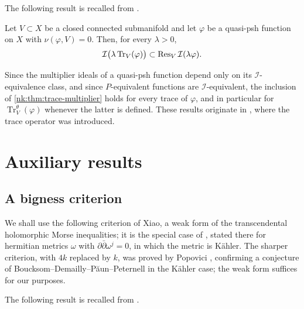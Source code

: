 The following result is recalled from \cite[Proposition~8.2.3]{SGPT}.

\begin{theorem}\label{nk:thm:trace-multiplier}
Let $V\subset X$ be a closed connected submanifold and let $\varphi$ be a
quasi-psh function on $X$ with $\nu(\varphi,V)=0$. Then, for every
$\lambda>0$,
\[
  \mathcal I\bigl(\lambda\operatorname{Tr}_V(\varphi)\bigr)\subset\operatorname{Res}_{V}\mathcal I(\lambda\varphi).
\]
\end{theorem}

Since the multiplier ideals of a quasi-psh function depend only on its
$\mathcal I$-equivalence class, and since $P$-equivalent functions are
$\mathcal I$-equivalent, the inclusion of \cref{nk:thm:trace-multiplier} holds for
every trace of $\varphi$, and in particular for
$\operatorname{Tr}^\theta_V(\varphi)$ whenever the latter is defined. These results
originate in \cite{DX24}, where the trace operator was introduced.

\section{Auxiliary results}\label{nk:sec:aux}

\subsection{A bigness criterion}

We shall use the following criterion of Xiao, a weak form of the
transcendental holomorphic Morse inequalities; it is the special case of
\cite[Theorem~1.4]{Xiao15}, stated there for hermitian metrics $\omega$
with $\partial\bar\partial\omega^j=0$, in which the metric is K\"ahler.
The sharper criterion, with $4k$ replaced by $k$, was proved by
Popovici \cite[Theorem~1.1]{Pop16}, confirming a conjecture of
Boucksom--Demailly--P\u{a}un--Peternell in the K\"ahler case; the weak
form suffices for our purposes.

The following result is recalled from \cite[Theorem~1.4]{Xiao15}.

